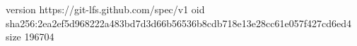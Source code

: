 version https://git-lfs.github.com/spec/v1
oid sha256:2ea2ef5d968222a483bd7d3d66b56536b8cdb718e13e28cc61e057f427cd6ed4
size 196704
